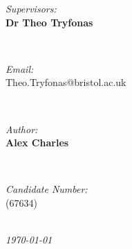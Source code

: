 \documentclass[10pt]{article}
\makeatletter
\newcommand{\StudentNameA}{Alex Charles}
\newcommand{\StudentNumberA}{67634}
\newcommand{\SupervisorNameA}{Dr Theo Tryfonas}
\newcommand{\SupervisorEmailA}{Theo.Tryfonas@bristol.ac.uk}
\makeatother
\begin{document}
\begin{titlepage}
\begin{minipage}{0.4\textwidth}
\begin{flushleft} \large
\emph{Supervisors:}\\
\textbf{\SupervisorNameA}\\
\end{flushleft}
\end{minipage}
~
\begin{minipage}{0.4\textwidth}
\begin{flushright} \large
\emph{Email:} \\
\SupervisorEmailA\\

\end{flushright}
\end{minipage}\\[1cm]

\begin{minipage}{0.4\textwidth}
\begin{flushleft} \large
\emph{Author:}\\
	\textbf{\StudentNameA}
\end{flushleft}
\end{minipage}
~
\begin{minipage}{0.4\textwidth}
\begin{flushright} \large
\emph{Candidate Number:} \\
(\StudentNumberA)\\
\end{flushright}
\end{minipage}\\[2cm]

\textit{{\large \today}}\\[1cm] %
\vfill %
\end{titlepage}
\end{document}
